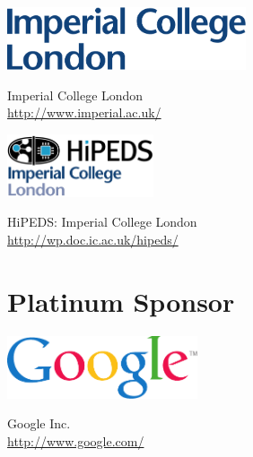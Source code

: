 \documentclass[a4paper,UKenglish]{oasicsmaster-v2016}
\begin{document}
\noindent
\begin{minipage}{0.6\textwidth}
  \begin{center}
  \includegraphics[height=5em]{imperial}
  \end{center}
\end{minipage}
\begin{minipage}{0.39\textwidth}
  Imperial College London\\
  \url{http://www.imperial.ac.uk/}
\end{minipage}
\bigskip

\noindent
\begin{minipage}{0.6\textwidth}
  \begin{center}
  \includegraphics[height=5em]{hipeds}
  \end{center}
\end{minipage}
\begin{minipage}{0.39\textwidth}
  HiPEDS: Imperial College London\\
  \url{http://wp.doc.ic.ac.uk/hipeds/}
\end{minipage}

\bigskip
\section*{Platinum Sponsor}
\bigskip

\noindent
\begin{minipage}{0.6\textwidth}
  \begin{center}
  \includegraphics[height=5em]{google}
  \end{center}
\end{minipage}
\begin{minipage}{0.39\textwidth}
  Google Inc.\\
  \url{http://www.google.com/}
\end{minipage}



\end{document}
